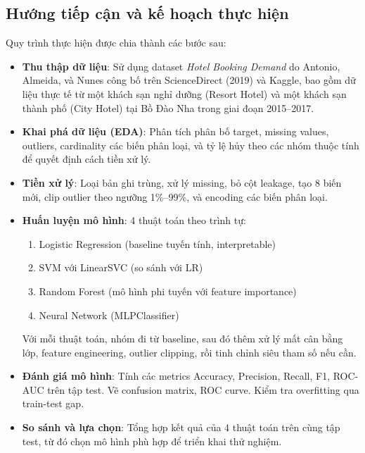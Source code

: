 \documentclass[12pt, a4paper]{article}
\begin{document}
\subsection{Hướng tiếp cận và kế hoạch thực hiện}

Quy trình thực hiện được chia thành các bước sau:

\begin{itemize}
    \item \textbf{Thu thập dữ liệu}: Sử dụng dataset \emph{Hotel Booking Demand} do Antonio, Almeida, và Nunes công bố trên ScienceDirect (2019) và Kaggle, bao gồm dữ liệu thực tế từ một khách sạn nghỉ dưỡng (Resort Hotel) và một khách sạn thành phố (City Hotel) tại Bồ Đào Nha trong giai đoạn 2015--2017.

    \item \textbf{Khai phá dữ liệu (EDA)}: Phân tích phân bố target, missing values, outliers, cardinality các biến phân loại, và tỷ lệ hủy theo các nhóm thuộc tính để quyết định cách tiền xử lý.

    \item \textbf{Tiền xử lý}: Loại bản ghi trùng, xử lý missing, bỏ cột leakage, tạo 8 biến mới, clip outlier theo ngưỡng 1\%--99\%, và encoding các biến phân loại.

    \item \textbf{Huấn luyện mô hình}: 4 thuật toán theo trình tự:
    \begin{enumerate}
        \item Logistic Regression (baseline tuyến tính, interpretable)
        \item SVM với LinearSVC (so sánh với LR)
        \item Random Forest (mô hình phi tuyến với feature importance)
        \item Neural Network (MLPClassifier)
    \end{enumerate}
    Với mỗi thuật toán, nhóm đi từ baseline, sau đó thêm xử lý mất cân bằng lớp, feature engineering, outlier clipping, rồi tinh chỉnh siêu tham số nếu cần.

    \item \textbf{Đánh giá mô hình}: Tính các metrics Accuracy, Precision, Recall, F1, ROC-AUC trên tập test. Vẽ confusion matrix, ROC curve. Kiểm tra overfitting qua train-test gap.

    \item \textbf{So sánh và lựa chọn}: Tổng hợp kết quả của 4 thuật toán trên cùng tập test, từ đó chọn mô hình phù hợp để triển khai thử nghiệm.
\end{itemize}
\end{document}
